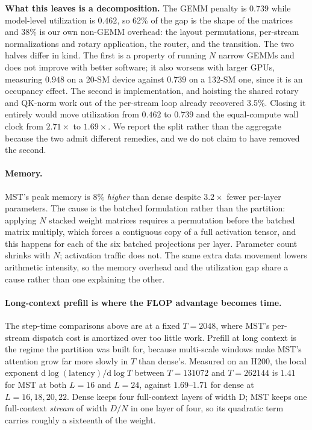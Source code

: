 \documentclass{article}
\newcommand{\dmodel}{D}
\newcommand{\nsub}{N}
\begin{document}
\textbf{What this leaves is a decomposition.} The GEMM penalty is $0.739$ while
model-level utilization is $0.462$, so 62\% of the gap is the shape of the
matrices and 38\% is our own non-GEMM overhead: the layout permutations,
per-stream normalizations and rotary application, the router, and the transition.
The two halves differ in kind. The first is a property of running $\nsub$ narrow
GEMMs and does not improve with better software; it also worsens with larger
GPUs, measuring $0.948$ on a 20-SM device against $0.739$ on a 132-SM one, since
it is an occupancy effect. The second is implementation, and hoisting the shared
rotary and QK-norm work out of the per-stream loop already recovered 3.5\%.
Closing it entirely would move utilization from $0.462$ to $0.739$ and the
equal-compute wall clock from $2.71\times$ to $1.69\times$. We report the split
rather than the aggregate because the two admit different remedies, and we do not
claim to have removed the second.

\paragraph{Memory.} MST's peak memory is $8\%$ \emph{higher} than dense despite
$3.2\times$ fewer per-layer parameters. The cause is the batched formulation
rather than the partition: applying $\nsub$ stacked weight matrices requires a
permutation before the batched matrix multiply, which forces a contiguous copy of
a full activation tensor, and this happens for each of the six batched
projections per layer. Parameter count shrinks with $\nsub$; activation traffic
does not. The same extra data movement lowers arithmetic intensity, so the memory
overhead and the utilization gap share a cause rather than one explaining the
other.

\paragraph{Long-context prefill is where the FLOP advantage becomes time.}
The step-time comparisons above are at a fixed $T{=}2048$, where MST's per-stream
dispatch cost is amortized over too little work. Prefill at long context is the
regime the partition was built for, because multi-scale windows make MST's
attention grow far more slowly in $T$ than dense's. Measured on an H200, the
local exponent $\mathrm{d}\log(\text{latency})/\mathrm{d}\log T$ between
$T{=}131072$ and $T{=}262144$ is $1.41$ for MST at both $L{=}16$ and $L{=}24$,
against $1.69$--$1.71$ for dense at $L{=}16,18,20,22$. Dense keeps four
full-context layers of width \dmodel; MST keeps one full-context \emph{stream} of
width $\dmodel/\nsub$ in one layer of four, so its quadratic term carries roughly
a sixteenth of the weight.
\end{document}
